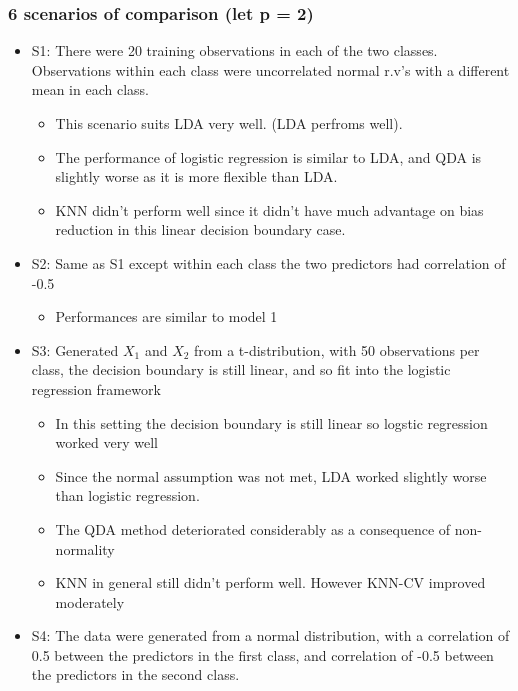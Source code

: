 \documentclass{article}
\begin{document}
\subsubsection{6 scenarios of comparison (let p = 2)}

\begin{itemize}
    \item S1: There were 20 training observations in each of the two classes. Observations within each class were uncorrelated normal r.v's with a different mean in each class.
    \begin{itemize}
        \item This scenario suits LDA very well. (LDA perfroms well).
        \item The performance of logistic regression is similar to LDA, and QDA is slightly worse as it is more flexible than LDA.
        \item KNN didn't perform well since it didn't have much advantage on bias reduction in this linear decision boundary case.
    \end{itemize}
    \item S2: Same as S1 except within each class the two predictors had correlation of -0.5
    \begin{itemize}
        \item Performances are similar to model 1
    \end{itemize}
    \item S3: Generated $X_1$ and $X_2$ from a t-distribution, with 50 observations per class, the decision boundary is still linear, and so fit into the logistic regression framework
    \begin{itemize}
        \item In this setting the decision boundary is still linear so logstic regression worked very well
        \item Since the normal assumption was not met, LDA worked slightly worse than logistic regression.
        \item The QDA method deteriorated considerably as a consequence of non-normality
        \item KNN in general still didn't perform well. However KNN-CV improved moderately
    \end{itemize}
    \item S4: The data were generated from a normal distribution, with a correlation of 0.5 between the predictors in the first class, and correlation of -0.5 between the predictors in the second class.
    \begin{itemize}

\end{itemize}
\end{itemize}
\end{document}
